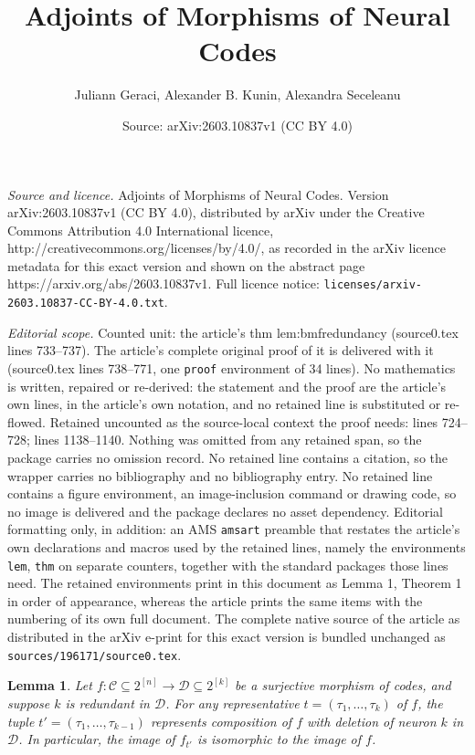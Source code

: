 \documentclass[10pt,a4paper]{amsart}
\title{Adjoints of Morphisms of Neural Codes}
\author{Juliann Geraci, Alexander B. Kunin, Alexandra Seceleanu}
\date{Source: arXiv:2603.10837v1 (CC BY 4.0)}
\newtheorem{lem}{Lemma}
\def\cC{\mathcal{C}}
\def\cD{\mathcal{D}}
\begin{document}
\maketitle

\noindent\emph{Source and licence.} Adjoints of Morphisms of Neural Codes. Version arXiv:2603.10837v1 (CC BY 4.0), distributed by arXiv under the Creative Commons Attribution 4.0 International licence, http://creativecommons.org/licenses/by/4.0/, as recorded in the arXiv licence metadata for this exact version and shown on the abstract page https://arxiv.org/abs/2603.10837v1. Full licence notice: \texttt{licenses/arxiv-2603.10837-CC-BY-4.0.txt}.\par\smallskip

\noindent\textit{Editorial scope.} Counted unit: the article's thm lem:bmfredundancy (source0.tex lines 733--737). The article's complete original proof of it is delivered with it (source0.tex lines 738--771, one \texttt{proof} environment of 34 lines). No mathematics is written, repaired or re-derived: the statement and the proof are the article's own lines, in the article's own notation, and no retained line is substituted or re-flowed.  Retained uncounted as the source-local context the proof needs: lines 724--728; lines 1138--1140.  Nothing was omitted from any retained span, so the package carries no omission record.  No retained line contains a citation, so the wrapper carries no bibliography and no bibliography entry.  No retained line contains a figure environment, an image-inclusion command or drawing code, so no image is delivered and the package declares no asset dependency.  Editorial formatting only, in addition: an AMS \texttt{amsart} preamble that restates the article's own declarations and macros used by the retained lines, namely the environments \texttt{lem}, \texttt{thm} on separate counters, together with the standard packages those lines need.  The retained environments print in this document as Lemma 1, Theorem 1 in order of appearance, whereas the article prints the same items with the numbering of its own full document.  The complete native source of the article as distributed in the arXiv e-print for this exact version is bundled unchanged as \texttt{sources/196171/source0.tex}.
        \begin{lem}\label{lem:redundancyinimage}
            Let $f: \cC \subseteq2^{[n]} \to \cD\subseteq2^{[k]}$ be a surjective morphism of codes, and suppose $k$ is redundant in $\cD$.
            For any representative $t = (\tau_1,\dots,\tau_k)$ of $f$, the tuple $t' = (\tau_1,\dots,\tau_{k-1})$ represents composition of $f$ with deletion of neuron $k$ in $\cD$.
            In particular, the image of $f_{t'}$ is isomorphic to the image of $f$.
        \end{lem}
\end{document}
